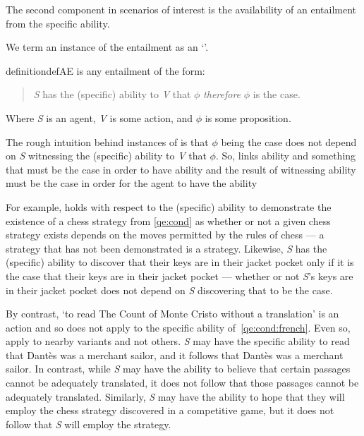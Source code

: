 \begin{note}
  The second component in scenarios of interest is the availability of an entailment from the specific ability.

  We term an instance of the entailment as an `\aben{}'.

  \begin{restatable}{definition}{defAE}\label{def:aben}
     is any entailment of the form:
    \begin{quote}
      \emph{S} has the (specific) ability to \emph{V} that \(\phi\) \emph{therefore} \(\phi\) is the case.
    \end{quote}
    Where \emph{S} is an agent, \emph{V} is some action, and \(\phi\) is some proposition.
  \end{restatable}

  The rough intuition behind instances of  is that \(\phi\) being the case does not depend on \emph{S} witnessing the (specific) ability to \emph{V} that \(\phi\).
  So,  links ability and something that must be the case in order to have ability and the result of witnessing ability must be the case in order for the agent to have the ability

  For example,  holds with respect to the (specific) ability to demonstrate the existence of a chess strategy from \ref{qe:cond} as whether or not a given chess strategy exists depends on the moves permitted by the rules of chess --- a strategy that has not been demonstrated is a strategy.
  Likewise, \emph{S} has the (specific) ability to discover that their keys are in their jacket pocket only if it is the case that their keys are in their jacket pocket --- whether or not \emph{S}'s keys are in their jacket pocket does not depend on \emph{S} discovering that to be the case.

  By contrast, `to read The Count of Monte Cristo without a translation' is an action and so  does not apply to the specific ability of~\ref{qe:cond:french}.
  Even so,  apply to nearby variants and not others.
  \emph{S} may have the specific ability to read that Dantès was a merchant sailor, and it follows that Dantès was a merchant sailor.
  In contrast, while \emph{S} may have the ability to believe that certain passages cannot be adequately translated, it does not follow that those passages cannot be adequately translated.
  Similarly, \emph{S} may have the ability to hope that they will employ the chess strategy discovered in a competitive game, but it does not follow that \emph{S} will employ the strategy.


\end{note}
